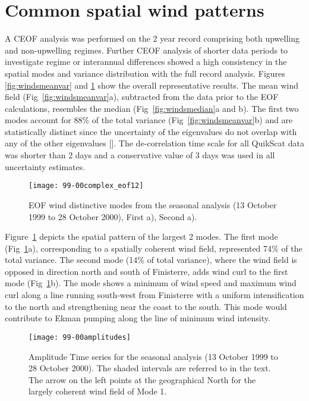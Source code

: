 \section{Common spatial wind patterns}
A CEOF analysis was performed on the 2 year record comprising both
upwelling and non-upwelling regimes. Further CEOF analysis of
shorter data periods to investigate regime or interannual
differences showed a high consistency in the spatial modes and
variance distribution with the full record analysis. Figures
\ref{fig:windsmeanvar} and \ref{fig:windseofseasonal} show the
overall representative results. The mean wind field
(Fig~\ref{fig:windsmeanvar}a), subtracted from the data prior to
the EOF calculations, resembles the median
(Fig~\ref{fig:windsmedian}a and b). The first two modes account
for 88\% of the total variance (Fig~\ref{fig:windsmeanvar}b) and
are statistically distinct since the uncertainty of the
eigenvalues do not overlap with any of the other eigenvalues
\nocite{north82}[]. The
de-correlation time scale for all QuikScat data was shorter than 2
days and a conservative value of 3 days was used in all
uncertainty estimates.
\begin{figure}
\centering
\texttt{[image: 99-00complex\_eof12]}
\caption{EOF wind distinctive modes from the seasonal analysis (13
October 1999 to 28 October 2000), First a), Second
a).}\label{fig:windseofseasonal}
\end{figure}

Figure~\ref{fig:windseofseasonal} depicts the spatial pattern of
the largest 2 modes. The first mode
({Fig~\ref{fig:windseofseasonal}}a), corresponding to a spatially
coherent wind field, represented 74\% of the total variance.  The
second mode (14\% of total variance), where the wind field is
opposed in direction north and south of Finisterre, adds wind curl
to the first mode  (Fig~\ref{fig:windseofseasonal}b). The mode
shows a minimum of wind speed and maximum wind curl along a line
running south-west from Finisterre with a uniform intensification
to the north and strengthening near the coast to the south. This
mode would contribute to Ekman pumping along the line of minimum
wind intensity.
\begin{figure}[t]
\centering
\texttt{[image: 99-00amplitudes]}
\caption{Amplitude Time series for the seasonal analysis (13
October 1999 to 28 October 2000). The shaded intervals are
referred to in the text. The arrow on the left points at the
geographical North for the largely coherent wind field of Mode
1.}\label{fig:windsampseasonal}
\end{figure}
